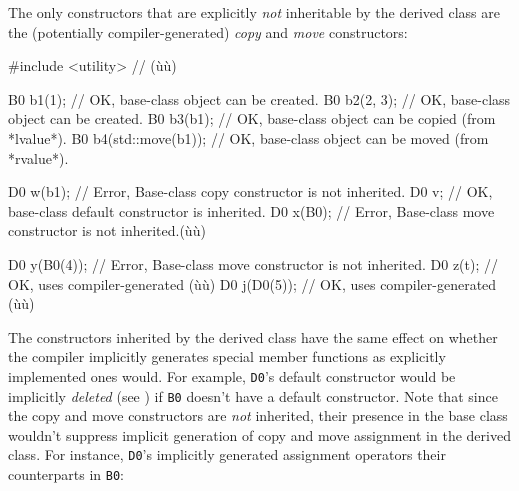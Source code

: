 \noindent The only constructors that are explicitly \emph{not} inheritable by the
derived class are the (potentially compiler-generated) \emph{copy} and
\emph{move} constructors:

\begin{emcppslisting}[emcppsbatch=e1]
#include <utility>  // (ù{}ù)

B0 b1(1);              // OK, base-class object can be created.
B0 b2(2, 3);           // OK, base-class object can be created.
B0 b3(b1);             // OK, base-class object can be copied (from *lvalue*).
B0 b4(std::move(b1));  // OK, base-class object can be moved (from *rvalue*).

D0 w(b1);    // Error, Base-class copy constructor is not inherited.
D0 v;        // OK, base-class default constructor is inherited.
D0 x(B0{});  // Error, Base-class move constructor is not inherited.(ù{\footnotemark}ù)

D0 y(B0(4));  // Error, Base-class move constructor is not inherited.
D0 z(t);      // OK, uses compiler-generated (ù{}ù)
D0 j(D0(5));  // OK, uses compiler-generated (ù{}ù)
\end{emcppslisting}
{\cprotect{}}
    
\noindent The constructors inherited by the derived class have the same effect on
whether the compiler implicitly generates special member functions as
explicitly implemented ones would. For example, \lstinline!D0!'s default
constructor would be implicitly \emph{deleted} (see ) 
if
\lstinline!B0! doesn't have a default constructor. Note that since the copy
and move constructors are \emph{not} inherited, their presence in the
base class wouldn't suppress implicit generation of copy and move
assignment in the derived class. For instance, \lstinline!D0!'s implicitly
generated assignment operators  their
counterparts in \lstinline!B0!:

